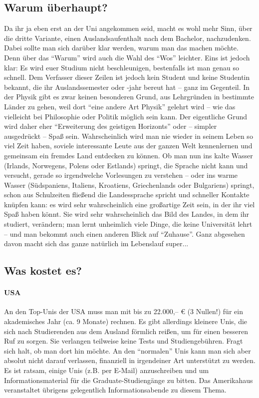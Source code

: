 \subsection{Warum überhaupt?}
Da ihr ja eben erst an der Uni angekommen seid, macht es wohl mehr Sinn, über die dritte Variante, einen Auslandsaufenthalt nach dem Bachelor, nachzudenken. Dabei sollte man sich darüber klar werden, warum man das machen möchte. Denn über das \enquote{Warum} wird auch die Wahl des \enquote{Wos} leichter. Eins ist jedoch klar: Es wird euer Studium nicht beschleunigen, bestenfalls ist man genau so schnell. Dem Verfasser dieser Zeilen ist jedoch kein Student und keine Studentin bekannt, die ihr Auslandssemester oder -jahr bereut hat -- ganz im Gegenteil. In der Physik gibt es zwar keinen besonderen Grund, aus Lehrgründen in bestimmte Länder zu gehen, weil dort \enquote{eine andere Art Physik} gelehrt wird -- wie das vielleicht bei Philosophie oder Politik möglich sein kann. Der eigentliche Grund wird daher eher \enquote{Erweiterung des geistigen Horizonts} oder -- simpler ausgedrückt -- Spaß sein. Wahrscheinlich wird man nie wieder in seinem Leben so viel Zeit haben, soviele interessante Leute aus der ganzen Welt kennenlernen und gemeinsam ein fremdes Land entdecken zu können. Ob man nun ins kalte Wasser (Irlands, Norwegens, Polens oder Estlands) springt, die Sprache nicht kann und versucht, gerade so irgendwelche Vorlesungen zu verstehen -- oder ins warme Wasser (Südspaniens, Italiens, Kroatiens, Griechenlands oder Bulgariens) springt, schon aus Schulzeiten fließend die Landessprache spricht und schneller Kontakte knüpfen kann: es wird sehr wahrscheinlich eine großartige Zeit sein, in der ihr viel Spaß haben könnt. Sie wird sehr wahrscheinlich das Bild des Landes, in dem ihr studiert, verändern; man lernt unheimlich viele Dinge, die keine Universität lehrt -- und man bekommt auch einen anderen Blick auf \enquote{Zuhause}. Ganz abgesehen davon macht sich das ganze natürlich im Lebenslauf super...

\subsection{Was kostet es?}
\paragraph{USA} An den Top-Unis der USA muss man mit bis zu 22.000,-- \euro{} (3 Nullen!) für ein akademisches Jahr (ca. 9 Monate) rechnen. Es gibt allerdings kleinere Unis, die sich nach Studierenden aus dem Ausland förmlich reißen, um für einen besseren Ruf zu sorgen. Sie verlangen teilweise keine Tests und Studiengebühren. Fragt sich halt, ob man dort hin möchte. An den "`normalen"' Unis kann man sich aber absolut nicht darauf verlassen, finanziell in irgendeiner Art unterstützt zu werden. Es ist ratsam, einige Unis (z.B. per E-Mail) anzuschreiben und um Informationsmaterial für die Graduate-Studiengänge zu bitten. Das Amerikahaus veranstaltet übrigens gelegentlich Informationsabende zu diesem Thema.

